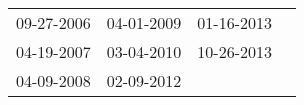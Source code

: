 \begin{supertabular}{llll}
 09-27-2006 &  04-01-2009 &  01-16-2013 \\
 04-19-2007 &  03-04-2010 &  10-26-2013 \\
 04-09-2008 &  02-09-2012 &             \\
\end{supertabular}
